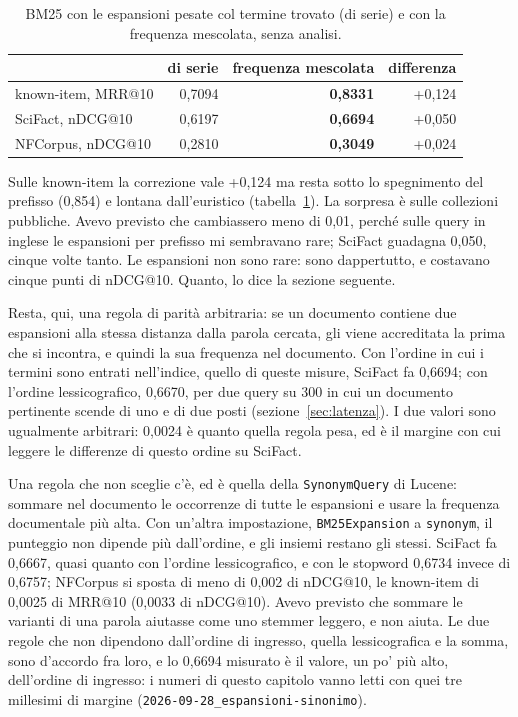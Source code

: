 \begin{table}[ht]
  \centering
  \begin{tabular}{lrrr}
    \toprule
    & di serie & frequenza mescolata & differenza \\
    \midrule
    known-item, MRR@10 & 0,7094 & \textbf{0,8331} & +0,124 \\
    SciFact, nDCG@10 & 0,6197 & \textbf{0,6694} & +0,050 \\
    NFCorpus, nDCG@10 & 0,2810 & \textbf{0,3049} & +0,024 \\
    \bottomrule
  \end{tabular}
  \caption{BM25 con le espansioni pesate col termine trovato (di serie) e con la
  frequenza mescolata, senza analisi.}
  \label{tab:espansioni}
\end{table}

Sulle known-item la correzione vale +0,124 ma resta sotto lo spegnimento del
prefisso (0,854) e lontana dall'euristico (tabella~\ref{tab:espansioni}). La
sorpresa è sulle collezioni pubbliche. Avevo previsto che cambiassero meno di
0,01, perché sulle query in inglese le espansioni per prefisso mi sembravano rare;
SciFact guadagna 0,050, cinque volte tanto. Le espansioni non sono rare: sono
dappertutto, e costavano cinque punti di nDCG@10. Quanto, lo dice la sezione
seguente.

Resta, qui, una regola di parità arbitraria: se un documento contiene due
espansioni alla stessa distanza dalla parola cercata, gli viene accreditata la
prima che si incontra, e quindi la sua frequenza nel documento. Con l'ordine in
cui i termini sono entrati nell'indice, quello di queste misure, SciFact fa
0,6694; con l'ordine lessicografico, 0,6670, per due query su 300 in cui un
documento pertinente scende di uno e di due posti (sezione~\ref{sec:latenza}). I due
valori sono ugualmente arbitrari: 0,0024 è quanto quella regola pesa, ed è il
margine con cui leggere le differenze di questo ordine su SciFact.

Una regola che non sceglie c'è, ed è quella della \texttt{SynonymQuery} di
Lucene: sommare nel documento le occorrenze di tutte le espansioni e usare la
frequenza documentale più alta. Con un'altra impostazione,
\texttt{BM25Expansion} a \texttt{synonym}, il punteggio non dipende più
dall'ordine, e gli insiemi restano gli stessi. SciFact fa 0,6667, quasi quanto
con l'ordine lessicografico, e con le stopword 0,6734 invece di 0,6757;
NFCorpus si sposta di meno di 0,002 di nDCG@10, le known-item di 0,0025 di
MRR@10 (0,0033 di nDCG@10). Avevo previsto che sommare le
varianti di una parola aiutasse come uno stemmer leggero, e non aiuta. Le due
regole che non dipendono dall'ordine di ingresso, quella lessicografica e la
somma, sono d'accordo fra loro, e lo 0,6694 misurato è il valore,
un po' più alto, dell'ordine di ingresso: i numeri di questo capitolo vanno
letti con quei tre millesimi di margine
(\texttt{2026-09-28\_espansioni-sinonimo}).

